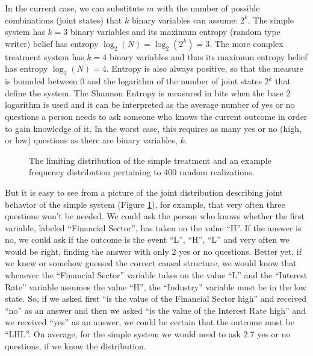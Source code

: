 In the current case, we can substitute $m$ with the number of possible combinations (joint states) that $k$ binary variables can assume: $2^k$.
The simple system has $k=3$ binary variables and its maximum entropy (random type writer) belief has entropy $\log_2(N)=\log_2(2^k) = 3$. The more complex treatment system has $k=4$ binary variables and thus its maximum entropy belief has entropy $\log_2(N) = 4$. Entropy is also always positive, so that the measure is bounded between $0$ and the logarithm of the number of joint states $2^k$ that define the system. The Shannon Entropy is measured in bits when the base $2$ logarithm is used and it can be interpreted as the average number of yes or no questions a person needs to ask someone who knows the current outcome in order to gain knowledge of it.  In the worst case, this requires as many yes or no (high, or low) questions as there are binary variables, $k$. 

\begin{figure}
\noindent{}
\caption{The limiting distribution of the simple treatment and an example frequency distribution pertaining to 400 random realizations.}
\label{fig:simplejoint} 
\end{figure}

But it is easy to see from a picture of the joint distribution describing joint behavior of the simple system (Figure \ref{fig:simplejoint}), for example, that very often three questions won't be needed. We could ask the person who knows whether the first variable, labeled ``Financial Sector'', has taken on the value ``H''.  If the answer is no, we could ask if the outcome is the event ``L'', ``H'', ``L'' and very often we would be right, finding the answer with only $2$ yes or no questions. Better yet, if we knew or somehow guessed the correct causal structure, we would know that whenever the ``Financial Sector'' variable takes on the value ``L'' and the ``Interest Rate'' variable assumes the value ``H'', the ``Industry'' variable must be in the low state. So, if we asked first ``is the value of the Financial Sector high'' and received ``no'' as an answer and then we asked ``is the value of the Interest Rate high'' and we received ``yes'' as an answer, we could be certain that the outcome must be ``LHL''. On average, for the simple system we would need to ask $2.7$ yes or no questions, if we know the distribution.   


